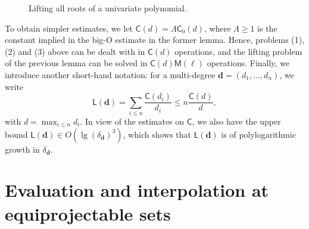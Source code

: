 \documentclass[amsthm]{elsart}
\def\d {\ensuremath{\mathbf{d}}}
\def\C {\ensuremath{\mathsf{C}}}
\def\L {\ensuremath{\mathsf{L}}}
\def\M {\ensuremath{\mathsf{M}}}
\theoremstyle{plain}
\begin{document}
\begin{figure}[!!!h]
\begin{center}
\caption{Lifting all roots of a univariate polynomial.}
\label{Fig:1}
\end{center}
\end{figure}

To obtain simpler estimates, we let $\C(d)= \Lambda \C_0(d)$, where
$\Lambda\ge 1$ is the constant implied in the big-O estimate in the
former lemma. Hence, problems (1), (2) and (3) above can be dealt with
in $\C(d)$ operations, and the lifting problem of the previous lemma
can be solved in $\C(d)\M(\ell)$ operations.  Finally, we introduce
another short-hand notation: for a multi-degree $\d=(d_1,\dots,d_n)$,
we write
\begin{equation}
  \label{eq:L}
\L(\d) =\sum_{i \le n} \frac {\C(d_i)}{d_i} \le n  \frac{\C(d)}{d},  
\end{equation}
with $d=\max_{i \le n} d_i$. In view of the estimates on $\C$, we
also have the upper bound $\L(\d) \in O(\lg(\delta_\d)^3)$, which shows
that $\L(\d)$ is of polylogarithmic growth in $\delta_\d$.



\section{Evaluation and interpolation at equiprojectable sets}\label{sec:equi}
\end{document}
